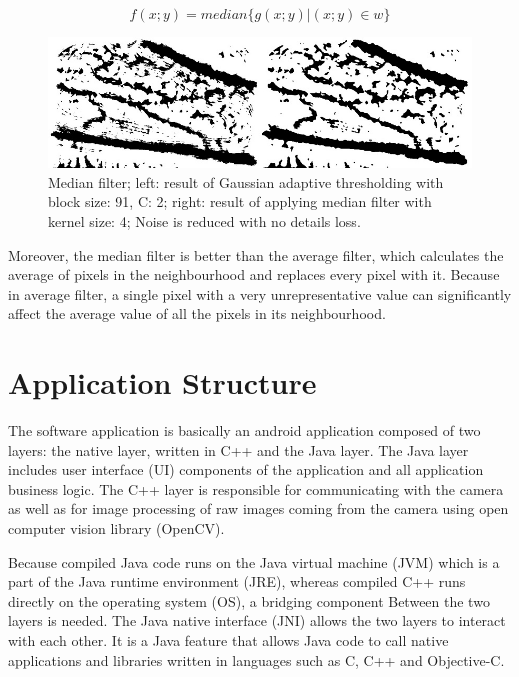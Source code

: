 \begin{equation}
f(x; y) = median \{g(x; y) | (x; y)\in w   \}
\end{equation}


\begin{figure}[H]
\centering
\includegraphics[scale=0.8]{figures/compare5.JPG}
 

\caption[Median filter]{Median filter; left: result of Gaussian adaptive thresholding with block size: 91, C: 2; right: result of applying median filter with kernel size: 4; Noise is reduced with no details loss.}\label{fig:compare5}
\end{figure}


Moreover, the median filter is better than the average filter, which calculates the average of pixels in the neighbourhood and replaces every pixel with it. Because in average filter, a single pixel with a very unrepresentative value can significantly affect the average value of all the pixels in its neighbourhood. 


\section{Application Structure}
The software application is basically an android application composed of two layers: the native layer, written in C++ and the Java layer. 
The Java layer includes user interface (UI) components of the application and all application business logic. 
The C++ layer is responsible for communicating with the camera as well as for image processing of raw images coming from the camera using open computer vision library (OpenCV).

Because compiled Java code runs on the Java virtual machine (JVM) which is a part of the Java runtime environment (JRE), whereas compiled C++ runs directly on the operating system (OS), a bridging component Between the two layers is needed.
The Java native interface (JNI) allows the two layers to interact with each other. It is a Java feature that allows Java code to call native applications and libraries written in languages such as C, C++ and Objective-C.

